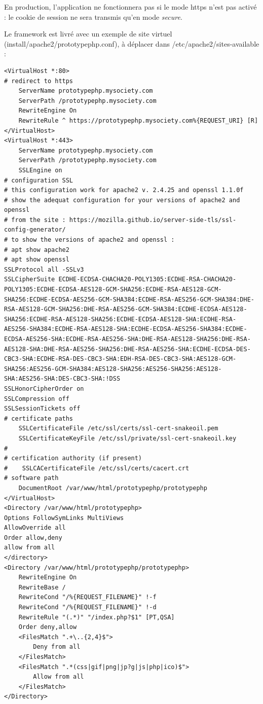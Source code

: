 En production, l'application ne fonctionnera pas si le mode https n'est pas activé : le cookie de session ne sera transmis qu'en mode \textit{secure}.

Le framework est livré avec un exemple de site virtuel (install/apache2/prototypephp.conf), à déplacer dans /etc/apache2/sites-available :

\begin{lstlisting}
<VirtualHost *:80>
# redirect to https
    ServerName prototypephp.mysociety.com
    ServerPath /prototypephp.mysociety.com
    RewriteEngine On
    RewriteRule ^ https://prototypephp.mysociety.com%{REQUEST_URI} [R]
</VirtualHost>
<VirtualHost *:443>
    ServerName prototypephp.mysociety.com
    ServerPath /prototypephp.mysociety.com
    SSLEngine on
# configuration SSL 
# this configuration work for apache2 v. 2.4.25 and openssl 1.1.0f
# show the adequat configuration for your versions of apache2 and openssl 
# from the site : https://mozilla.github.io/server-side-tls/ssl-config-generator/
# to show the versions of apache2 and openssl :
# apt show apache2
# apt show openssl
SSLProtocol all -SSLv3
SSLCipherSuite ECDHE-ECDSA-CHACHA20-POLY1305:ECDHE-RSA-CHACHA20-POLY1305:ECDHE-ECDSA-AES128-GCM-SHA256:ECDHE-RSA-AES128-GCM-SHA256:ECDHE-ECDSA-AES256-GCM-SHA384:ECDHE-RSA-AES256-GCM-SHA384:DHE-RSA-AES128-GCM-SHA256:DHE-RSA-AES256-GCM-SHA384:ECDHE-ECDSA-AES128-SHA256:ECDHE-RSA-AES128-SHA256:ECDHE-ECDSA-AES128-SHA:ECDHE-RSA-AES256-SHA384:ECDHE-RSA-AES128-SHA:ECDHE-ECDSA-AES256-SHA384:ECDHE-ECDSA-AES256-SHA:ECDHE-RSA-AES256-SHA:DHE-RSA-AES128-SHA256:DHE-RSA-AES128-SHA:DHE-RSA-AES256-SHA256:DHE-RSA-AES256-SHA:ECDHE-ECDSA-DES-CBC3-SHA:ECDHE-RSA-DES-CBC3-SHA:EDH-RSA-DES-CBC3-SHA:AES128-GCM-SHA256:AES256-GCM-SHA384:AES128-SHA256:AES256-SHA256:AES128-SHA:AES256-SHA:DES-CBC3-SHA:!DSS
SSLHonorCipherOrder on
SSLCompression off
SSLSessionTickets off
# certificate paths
    SSLCertificateFile /etc/ssl/certs/ssl-cert-snakeoil.pem
    SSLCertificateKeyFile /etc/ssl/private/ssl-cert-snakeoil.key  
# 
# certification authority (if present)
#    SSLCACertificateFile /etc/ssl/certs/cacert.crt
# software path
    DocumentRoot /var/www/html/prototypephp/prototypephp
</VirtualHost>
<Directory /var/www/html/prototypephp>
Options FollowSymLinks MultiViews
AllowOverride all
Order allow,deny
allow from all
</directory>
<Directory /var/www/html/prototypephp/prototypephp>
    RewriteEngine On
    RewriteBase /
    RewriteCond "/%{REQUEST_FILENAME}" !-f
    RewriteCond "/%{REQUEST_FILENAME}" !-d
    RewriteRule "(.*)" "/index.php?$1" [PT,QSA]
    Order deny,allow
    <FilesMatch ".+\..{2,4}$">
        Deny from all
    </FilesMatch>
    <FilesMatch ".*(css|gif|png|jp?g|js|php|ico)$">
        Allow from all
    </FilesMatch>
</Directory>
\end{lstlisting}



